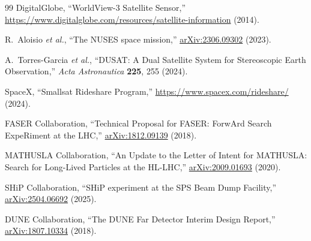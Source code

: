 \documentclass[11pt]{article}
\begin{document}
\begin{thebibliography}{99}
  DigitalGlobe,
  ``WorldView-3 Satellite Sensor,''
  \url{https://www.digitalglobe.com/resources/satellite-information} (2014).

  R.~Aloisio \textit{et al.},
  ``The NUSES space mission,''
  \href{https://arxiv.org/abs/2306.09302}{arXiv:2306.09302} (2023).

  A.~Torres-Garcia \textit{et al.},
  ``DUSAT: A Dual Satellite System for Stereoscopic Earth Observation,''
  \textit{Acta Astronautica} \textbf{225}, 255 (2024).

  SpaceX,
  ``Smallsat Rideshare Program,''
  \url{https://www.spacex.com/rideshare/} (2024).

  FASER Collaboration,
  ``Technical Proposal for FASER: ForwArd Search ExpeRiment at the LHC,''
  \href{https://arxiv.org/abs/1812.09139}{arXiv:1812.09139} (2018).

  MATHUSLA Collaboration,
  ``An Update to the Letter of Intent for MATHUSLA: Search for Long-Lived Particles at the HL-LHC,''
  \href{https://arxiv.org/abs/2009.01693}{arXiv:2009.01693} (2020).

  SHiP Collaboration,
  ``SHiP experiment at the SPS Beam Dump Facility,''
  \href{https://arxiv.org/abs/2504.06692}{arXiv:2504.06692} (2025).

  DUNE Collaboration,
  ``The DUNE Far Detector Interim Design Report,''
  \href{https://arxiv.org/abs/1807.10334}{arXiv:1807.10334} (2018).

\end{thebibliography}
\end{document}
